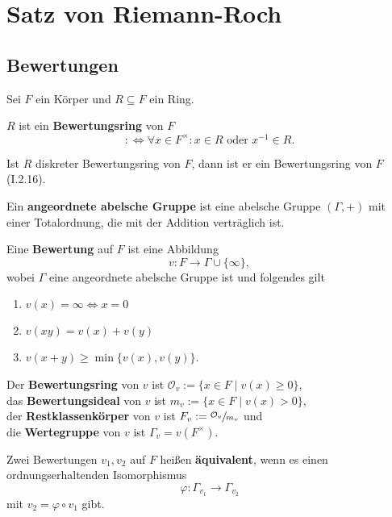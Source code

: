 \chapter{Satz von Riemann-Roch}
\section{Bewertungen}
Sei $F$ ein Körper und $R \subseteq F$ ein Ring.

\begin{definition}
    $R$ ist ein \textbf{Bewertungsring} von $F$
    $$:\iff \forall x  \in F^{\times}: x \in R \text{ oder } x^{-1} \in R.$$
\end{definition}

\begin{beispiel}
    Ist $R$ diskreter Bewertungsring von $F$, dann ist er ein Bewertungsring von $F$ (I.2.16).
\end{beispiel}

\begin{definition}
    Ein \textbf{angeordnete abelsche Gruppe} ist eine abelsche Gruppe $(\Gamma, +)$ mit einer
    Totalordnung, die mit der Addition verträglich ist.

    Eine \textbf{Bewertung} auf $F$ ist eine Abbildung
    $$ v: F \to \Gamma \cup \{\infty\}, $$
    wobei $\Gamma$ eine angeordnete abelsche Gruppe ist und folgendes gilt
    \begin{enumerate}[label=(\arabic*)]
        \item $v(x) = \infty \iff x = 0$
        \item $v(xy) = v(x) + v(y)$
        \item $v(x+y) \geq \min\{v(x), v(y)\}$.
    \end{enumerate}

    Der \textbf{Bewertungsring} von $v$ ist $\mathcal{O}_v := \{x \in F \mid v(x) \geq 0\}$,\\
    das \textbf{Bewertungsideal} von $v$ ist $m_v := \{x \in F \mid v(x) > 0\}$,\\
    der \textbf{Restklassenkörper} von $v$ ist $F_v := \sfrac{\mathcal{O}_v}{m_v}$ und\\
    die \textbf{Wertegruppe} von $v$ ist $\Gamma_v = v(F^\times)$.

    Zwei Bewertungen $v_1, v_2$ auf $F$ heißen \textbf{äquivalent}, wenn es einen ordnungserhaltenden
    Isomorphismus
    $$ \varphi : \Gamma_{v_1} \to \Gamma_{v_2}$$ mit $v_2 = \varphi \circ v_1$ gibt.
\end{definition}

